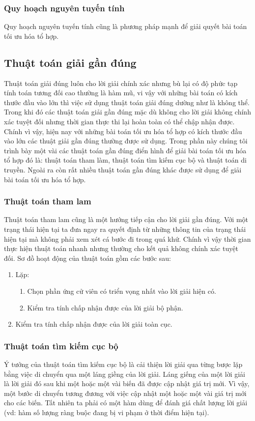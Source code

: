 \documentclass[a4paper,12pt]{report}
\begin{document}
\subsubsection{Quy hoạch nguyên tuyến tính}
Quy hoạch nguyên tuyến tính cũng là phương pháp mạnh để giải quyết bài toán tối ưu hóa tổ hợp. 
\subsection{Thuật toán giải gần đúng}
Thuật toán giải đúng luôn cho lời giải chính xác nhưng bù lại có độ phức tạp tính toán tương đối cao thường là hàm mũ, vi vậy với những bài toán có kích thước đầu vào lớn thì việc sử dụng thuật toán giải đúng dường như là không thể. Trong khi đó các thuật toán giải gần đúng mặc dù không cho lời giải không chính xác tuyệt đối nhưng thời gian thực thi lại hoàn toàn có thể chập nhận được. Chính vì vậy, hiện nay với những bài toán tối ưu hóa tổ hợp có kích thước đầu vào lớn các thuật giải gần đúng thường được sử dụng. Trong phần này chúng tôi trình bày một vài các thuật toán gần đúng điển hình để giải bài toán tối ưu hóa tổ hợp đó là: thuật toán tham làm, thuật toán tìm kiếm cục bộ và thuật toán di truyền. Ngoài ra còn rất nhiều thuật toán gần đúng khác được sử dụng để giải bài toán tối ưu hóa tổ hợp.
\subsubsection{Thuật toán tham lam}
Thuật toán tham lam cũng là một hướng tiếp cận cho lời giải gần đúng. Với một trạng thái hiện tại ta đưa ngay ra quyết định từ những thông tin của trạng thái hiện tại mà không phải xem xét cá bước đi trong quá khứ. Chính vì vậy thời gian thực hiện thuật toán nhanh nhưng thường cho kết quả không chính xác tuyệt đối. Sơ đồ hoạt động của thuật toán gồm các bước sau:
\begin{enumerate}
\item Lặp:
\begin{enumerate}

\item Chọn phần ứng cử viên có triển vọng nhất vào lời giải hiện có.
\item Kiểm tra tính chấp nhận được của lời giải bộ phận.

\end{enumerate}
\item Kiểm tra tính chấp nhận được của lời giải toàn cục. \cite{DAA}
\end{enumerate}
\subsubsection{Thuật toán tìm kiếm cục bộ}
Ý tưởng của thuật toán tìm kiếm cục bộ là cải thiện lời giải qua từng bược lặp bằng việc di chuyển qua một láng giềng của lời giải. Láng giếng của một lời giải là lời giải đó sau khi một hoặc một vài biến đã được cập nhật giá trị mới. Vì vậy, một bước di chuyển tương đương với việc cập nhật một hoặc một vài giá trị mới cho các biến. Tất nhiên ta phải có một hàm dùng để đánh giá chất lượng lời giải (vd: hàm số lượng ràng buộc đang bị vi phạm ở thời điểm hiện tại). 
\end{document}
